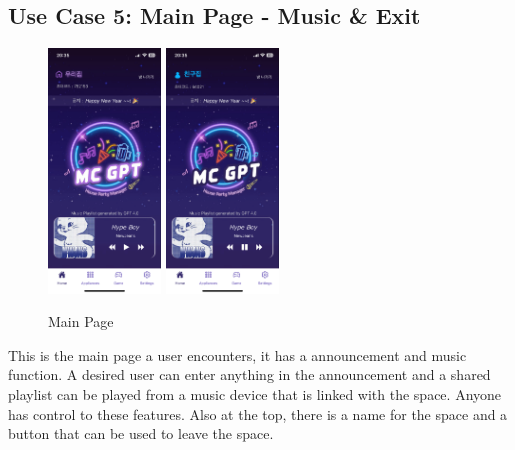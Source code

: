 \documentclass[conference]{IEEEtran}
\begin{document}
    \subsection{Use Case 5: Main Page - Music \& Exit}
        \begin{figure}[htbp]
            \centerline{\includegraphics[width=3cm]{Images/screen/home/1_HOME_MYHOME.PNG}
            \includegraphics[width=3cm]{Images/screen/home/3_HOME_FREINDHOME.PNG}}
            \caption{Main Page}
            \label{fig}
        \end{figure}
        This is the main page a user encounters, it has a announcement and music function. A desired user can enter anything in the announcement and a shared playlist can be played from a music device that is linked with the space. Anyone has control to these features. Also at the top, there is a name for the space and a button that can be used to leave the space. \\
\end{document}
